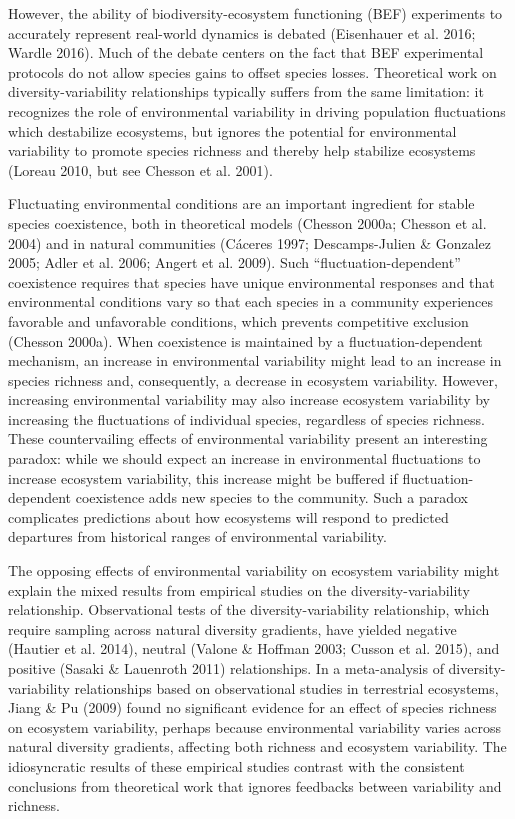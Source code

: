 \documentclass[12pt,]{article}
\begin{document}
However, the ability of biodiversity-ecosystem functioning (BEF)
experiments to accurately represent real-world dynamics is debated
(Eisenhauer et al. 2016; Wardle 2016). Much of the debate centers on the
fact that BEF experimental protocols do not allow species gains to
offset species losses. Theoretical work on diversity-variability
relationships typically suffers from the same limitation: it recognizes
the role of environmental variability in driving population fluctuations
which destabilize ecosystems, but ignores the potential for
environmental variability to promote species richness and thereby help
stabilize ecosystems (Loreau 2010, but see Chesson et al. 2001).

Fluctuating environmental conditions are an important ingredient for
stable species coexistence, both in theoretical models (Chesson 2000a;
Chesson et al. 2004) and in natural communities (Cáceres 1997;
Descamps-Julien \& Gonzalez 2005; Adler et al. 2006; Angert et al.
2009). Such ``fluctuation-dependent'' coexistence requires that species
have unique environmental responses and that environmental conditions
vary so that each species in a community experiences favorable and
unfavorable conditions, which prevents competitive exclusion (Chesson
2000a). When coexistence is maintained by a fluctuation-dependent
mechanism, an increase in environmental variability might lead to an
increase in species richness and, consequently, a decrease in ecosystem
variability. However, increasing environmental variability may also
increase ecosystem variability by increasing the fluctuations of
individual species, regardless of species richness. These countervailing
effects of environmental variability present an interesting paradox:
while we should expect an increase in environmental fluctuations to
increase ecosystem variability, this increase might be buffered if
fluctuation-dependent coexistence adds new species to the community.
Such a paradox complicates predictions about how ecosystems will respond
to predicted departures from historical ranges of environmental
variability.

The opposing effects of environmental variability on ecosystem
variability might explain the mixed results from empirical studies on
the diversity-variability relationship. Observational tests of the
diversity-variability relationship, which require sampling across
natural diversity gradients, have yielded negative (Hautier et al.
2014), neutral (Valone \& Hoffman 2003; Cusson et al. 2015), and
positive (Sasaki \& Lauenroth 2011) relationships. In a meta-analysis of
diversity-variability relationships based on observational studies in
terrestrial ecosystems, Jiang \& Pu (2009) found no significant evidence
for an effect of species richness on ecosystem variability, perhaps
because environmental variability varies across natural diversity
gradients, affecting both richness and ecosystem variability. The
idiosyncratic results of these empirical studies contrast with the
consistent conclusions from theoretical work that ignores feedbacks
between variability and richness.
\end{document}
